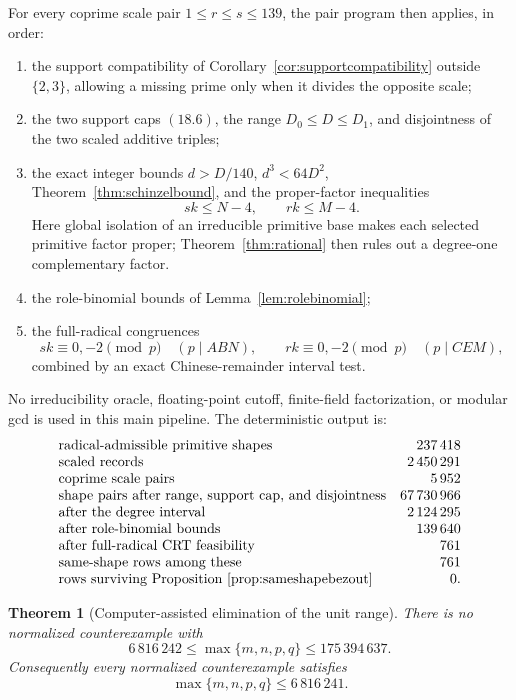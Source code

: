 \documentclass[11pt]{article}
\newtheorem{theorem}{Theorem}[section]
\theoremstyle{definition}
\begin{document}
For every coprime scale pair \(1\leq r\leq s\leq139\), the pair program
then applies, in order:
\begin{enumerate}[label=(\arabic*)]
\item the support compatibility of Corollary~\ref{cor:supportcompatibility}
outside \(\{2,3\}\), allowing a missing prime only when it divides the
opposite scale;
\item the two support caps \((18.6)\), the range \(D_0\leq D\leq D_1\),
and disjointness of the two scaled additive triples;
\item the exact integer bounds \(d>D/140\), \(d^3<64D^2\),
Theorem~\ref{thm:schinzelbound}, and the proper-factor inequalities
\[
 sk\leq N-4,
 \qquad rk\leq M-4.
\]
Here global isolation of an irreducible primitive base makes each selected
primitive factor proper; Theorem~\ref{thm:rational} then rules out a
degree-one complementary factor.
\item the role-binomial bounds of Lemma~\ref{lem:rolebinomial};
\item the full-radical congruences
\[
 sk\equiv0,-2\pmod p\quad(p\mid ABN),
 \qquad
 rk\equiv0,-2\pmod p\quad(p\mid CEM),
\]
combined by an exact Chinese-remainder interval test.
\end{enumerate}
No irreducibility oracle, floating-point cutoff, finite-field factorization,
or modular gcd is used in this main pipeline.  The deterministic output is:
\[
\begin{array}{lr}
\text{radical-admissible primitive shapes}&237\,418\\
\text{scaled records}&2\,450\,291\\
\text{coprime scale pairs}&5\,952\\
\text{shape pairs after range, support cap, and disjointness}&67\,730\,966\\
\text{after the degree interval}&2\,124\,295\\
\text{after role-binomial bounds}&139\,640\\
\text{after full-radical CRT feasibility}&761\\
\text{same-shape rows among these}&761\\
\text{rows surviving Proposition~\ref{prop:sameshapebezout}}&0.
\end{array}
\]

\begin{theorem}[Computer-assisted elimination of the unit range]
\label{thm:upperelimination}
There is no normalized counterexample with
\[
 6\,816\,242\leq\max\{m,n,p,q\}\leq175\,394\,637.
\]
Consequently every normalized counterexample satisfies
\begin{equation}
 \boxed{\max\{m,n,p,q\}\leq6\,816\,241.}
 \tag{18.10}
\end{equation}
\end{theorem}
\end{document}
